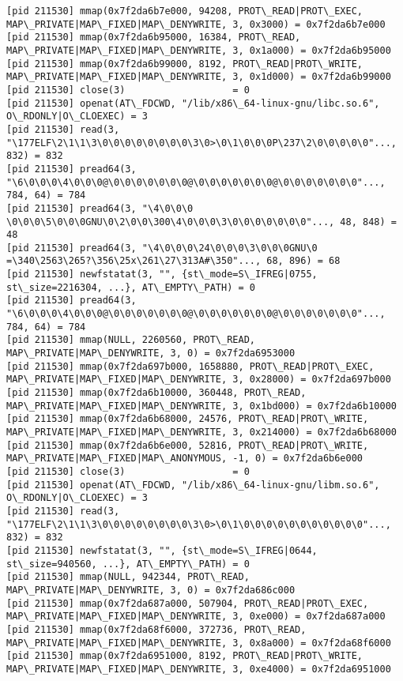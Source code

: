 \documentclass[a4paper, 12pt]{article}
\begin{document}
\begin{lstlisting}
[pid 211530] mmap(0x7f2da6b7e000, 94208, PROT\_READ|PROT\_EXEC, MAP\_PRIVATE|MAP\_FIXED|MAP\_DENYWRITE, 3, 0x3000) = 0x7f2da6b7e000
[pid 211530] mmap(0x7f2da6b95000, 16384, PROT\_READ, MAP\_PRIVATE|MAP\_FIXED|MAP\_DENYWRITE, 3, 0x1a000) = 0x7f2da6b95000
[pid 211530] mmap(0x7f2da6b99000, 8192, PROT\_READ|PROT\_WRITE, MAP\_PRIVATE|MAP\_FIXED|MAP\_DENYWRITE, 3, 0x1d000) = 0x7f2da6b99000
[pid 211530] close(3)                   = 0
[pid 211530] openat(AT\_FDCWD, "/lib/x86\_64-linux-gnu/libc.so.6", O\_RDONLY|O\_CLOEXEC) = 3
[pid 211530] read(3, "\177ELF\2\1\1\3\0\0\0\0\0\0\0\0\3\0>\0\1\0\0\0P\237\2\0\0\0\0\0"..., 832) = 832
[pid 211530] pread64(3, "\6\0\0\0\4\0\0\0@\0\0\0\0\0\0\0@\0\0\0\0\0\0\0@\0\0\0\0\0\0\0"..., 784, 64) = 784
[pid 211530] pread64(3, "\4\0\0\0 \0\0\0\5\0\0\0GNU\0\2\0\0\300\4\0\0\0\3\0\0\0\0\0\0\0"..., 48, 848) = 48
[pid 211530] pread64(3, "\4\0\0\0\24\0\0\0\3\0\0\0GNU\0 =\340\2563\265?\356\25x\261\27\313A#\350"..., 68, 896) = 68
[pid 211530] newfstatat(3, "", {st\_mode=S\_IFREG|0755, st\_size=2216304, ...}, AT\_EMPTY\_PATH) = 0
[pid 211530] pread64(3, "\6\0\0\0\4\0\0\0@\0\0\0\0\0\0\0@\0\0\0\0\0\0\0@\0\0\0\0\0\0\0"..., 784, 64) = 784
[pid 211530] mmap(NULL, 2260560, PROT\_READ, MAP\_PRIVATE|MAP\_DENYWRITE, 3, 0) = 0x7f2da6953000
[pid 211530] mmap(0x7f2da697b000, 1658880, PROT\_READ|PROT\_EXEC, MAP\_PRIVATE|MAP\_FIXED|MAP\_DENYWRITE, 3, 0x28000) = 0x7f2da697b000
[pid 211530] mmap(0x7f2da6b10000, 360448, PROT\_READ, MAP\_PRIVATE|MAP\_FIXED|MAP\_DENYWRITE, 3, 0x1bd000) = 0x7f2da6b10000
[pid 211530] mmap(0x7f2da6b68000, 24576, PROT\_READ|PROT\_WRITE, MAP\_PRIVATE|MAP\_FIXED|MAP\_DENYWRITE, 3, 0x214000) = 0x7f2da6b68000
[pid 211530] mmap(0x7f2da6b6e000, 52816, PROT\_READ|PROT\_WRITE, MAP\_PRIVATE|MAP\_FIXED|MAP\_ANONYMOUS, -1, 0) = 0x7f2da6b6e000
[pid 211530] close(3)                   = 0
[pid 211530] openat(AT\_FDCWD, "/lib/x86\_64-linux-gnu/libm.so.6", O\_RDONLY|O\_CLOEXEC) = 3
[pid 211530] read(3, "\177ELF\2\1\1\3\0\0\0\0\0\0\0\0\3\0>\0\1\0\0\0\0\0\0\0\0\0\0\0"..., 832) = 832
[pid 211530] newfstatat(3, "", {st\_mode=S\_IFREG|0644, st\_size=940560, ...}, AT\_EMPTY\_PATH) = 0
[pid 211530] mmap(NULL, 942344, PROT\_READ, MAP\_PRIVATE|MAP\_DENYWRITE, 3, 0) = 0x7f2da686c000
[pid 211530] mmap(0x7f2da687a000, 507904, PROT\_READ|PROT\_EXEC, MAP\_PRIVATE|MAP\_FIXED|MAP\_DENYWRITE, 3, 0xe000) = 0x7f2da687a000
[pid 211530] mmap(0x7f2da68f6000, 372736, PROT\_READ, MAP\_PRIVATE|MAP\_FIXED|MAP\_DENYWRITE, 3, 0x8a000) = 0x7f2da68f6000
[pid 211530] mmap(0x7f2da6951000, 8192, PROT\_READ|PROT\_WRITE, MAP\_PRIVATE|MAP\_FIXED|MAP\_DENYWRITE, 3, 0xe4000) = 0x7f2da6951000

\end{lstlisting}
\end{document}
